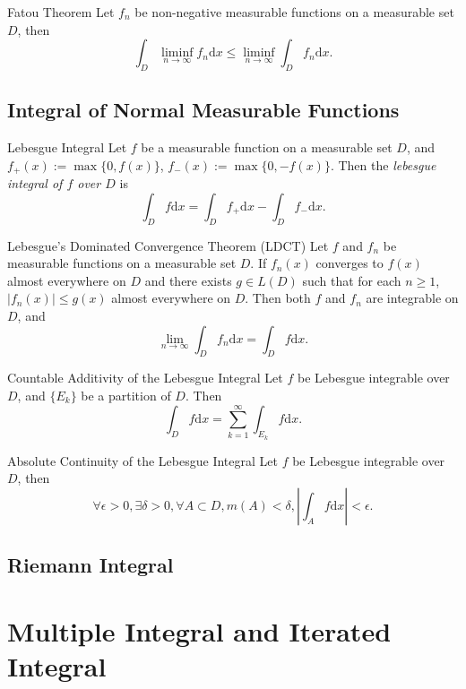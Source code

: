 \begin{theorem}{Fatou Theorem}{}
  Let $f_n$ be non-negative measurable functions on a measurable set $D$,
  then
  \begin{equation}
    \int_D \liminf \limits_{n \rightarrow \infty} f_n\mathrm{d} x
    \leq \liminf \limits_{n \rightarrow \infty} \int_D f_n\mathrm{d} x.
  \end{equation}
\end{theorem}

\subsection{Integral of Normal Measurable Functions}

\begin{definition}{Lebesgue Integral}{}
  Let $f$ be a measurable function on a measurable set $D$,
  and $f_+(x) := \max\{0, f(x)\}$, $f_-(x) := \max\{0, -f(x)\}$.
  Then the \emph{lebesgue integral of $f$ over $D$} is
  \begin{equation}
    \int_D f \mathrm{d} x 
    = \int_D f_+ \mathrm{d} x - \int_D f_-\mathrm{d} x.
  \end{equation}
\end{definition}

\begin{theorem}{Lebesgue's Dominated Convergence Theorem (LDCT)}{}
  Let $f$ and $f_n$ be measurable functions on a measurable set $D$.
  If $f_n(x)$ converges to $f(x)$ almost everywhere on $D$ and
  there exists $g \in L(D)$ such that for each $n \geq 1$,
  $|f_n(x)| \leq g(x)$ almost everywhere on $D$.
  Then both $f$ and $f_n$ are integrable on $D$, and
  \begin{equation}
    \lim \limits _{n \rightarrow \infty} \int_D f_n\mathrm{d} x
    = \int_D f\mathrm{d}x.
  \end{equation}
\end{theorem}

\begin{theorem}{Countable Additivity of the Lebesgue Integral}{}
  Let $f$ be Lebesgue integrable over $D$,
  and $\{E_k\}$ be a partition of $D$. Then
  \begin{equation}
    \int_D f \mathrm{d} x = \sum\limits_{k = 1}^{\infty} \int_{E_k} f \mathrm{d} x.
  \end{equation}
\end{theorem}

\begin{theorem}{Absolute Continuity of the Lebesgue Integral}{}
  Let $f$ be Lebesgue integrable over $D$,
  then
  \begin{equation}
    \forall \epsilon > 0, \exists \delta > 0, \forall A \subset D,
    m(A) < \delta, \left| \int_A f \mathrm{d} x \right| < \epsilon.
  \end{equation}
\end{theorem}

\subsection{Riemann Integral}


\section{Multiple Integral and Iterated Integral}







